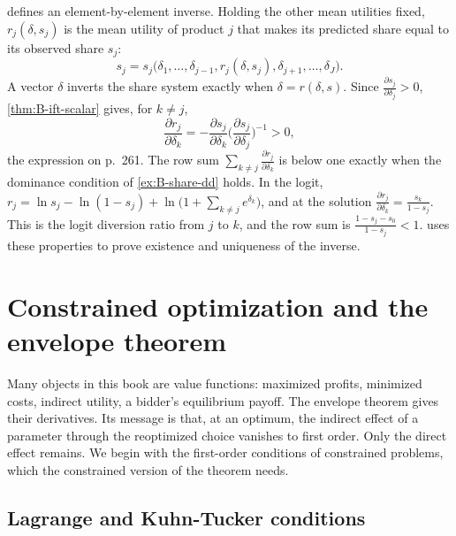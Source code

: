 \begin{example}\label{ex:B-berry-inverse}
 defines an element-by-element inverse. Holding the other mean utilities fixed,
$r_j(\delta, s_j)$ is the mean utility of product $j$ that makes its predicted share equal to its observed share $s_j$:
\begin{equation*}
s_j = s_j\big(\delta_1, \dots, \delta_{j - 1}, r_j(\delta, s_j), \delta_{j + 1}, \dots, \delta_J\big) .
\end{equation*}
A vector $\delta$ inverts the share system exactly when $\delta = r(\delta, s)$. Since $\frac{\partial s_j}{\partial \delta_j} > 0$,
\cref{thm:B-ift-scalar} gives, for $k \neq j$,
\begin{equation*}
\frac{\partial r_j}{\partial \delta_k} = -\frac{\partial s_j}{\partial \delta_k}\Big(\frac{\partial s_j}{\partial \delta_j}\Big)^{-1} > 0 ,
\end{equation*}
the expression on p.~261. The row sum $\sum_{k \neq j}\frac{\partial r_j}{\partial \delta_k}$ is below one exactly when the
dominance condition of \cref{ex:B-share-dd} holds. In the logit,
$r_j = \ln s_j - \ln(1 - s_j) + \ln\big(1 + \sum_{k \neq j}e^{\delta_k}\big)$, and at the solution
$\frac{\partial r_j}{\partial \delta_k} = \frac{s_k}{1 - s_j}$. This is the logit diversion ratio from $j$ to $k$, and the row
sum is $\frac{1 - s_j - s_0}{1 - s_j} < 1$.  uses these properties to prove existence and uniqueness
of the inverse.
\end{example}

\section{Constrained optimization and the envelope theorem}\label{sec:B-envelope}

Many objects in this book are value functions: maximized profits, minimized costs, indirect utility, a bidder's
equilibrium payoff. The envelope theorem gives their derivatives. Its message is that, at an optimum, the indirect
effect of a parameter through the reoptimized choice vanishes to first order. Only the direct effect remains. We
begin with the first-order conditions of constrained problems, which the constrained version of the theorem needs.

\subsection{Lagrange and Kuhn-Tucker conditions}\label{sec:B-kkt}

